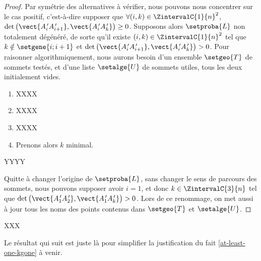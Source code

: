 \begin{proof}
    Par symétrie des alternatives à vérifier, nous pouvons nous concentrer sur le cas positif, c'est-à-dire supposer que
    $\forall (i, k) \in \ZintervalC{1}{n}^2$,
	$\det \big( \vect{A^{\,\prime}_i A^{\,\prime}_{i+1}}, \vect{A^{\,\prime}_i A^{\,\prime}_k} \big) \geq 0$.
    Supposons alors $\setproba{L}$ non totalement dégénéré, de sorte qu'il existe 
    $(i, k) \in \ZintervalC{1}{n}^2$ tel que
	$k \notin \setgene{i ; i+1}$
	et
	$\det \big( \vect{A^{\,\prime}_i A^{\,\prime}_{i+1}}, \vect{A^{\,\prime}_i A^{\,\prime}_k} \big) > 0$.
	Pour raisonner algorithmiquement, nous aurons besoin d'un ensemble $\setgeo{T}$ de sommets testés, et d'une liste $\setalge{U}$ de sommets utiles, tous les deux initialement vides.
	\begin{enumerate}
    	\item XXXX


    	\item XXXX


    	\item XXXX


    	\item Prenons alors $k$ minimal.
    \end{enumerate}
    
    
    YYYY
    
    
    Quitte à changer l'origine de $\setproba{L}$, sans changer le sens de parcours des sommets, nous pouvons supposer avoir $i = 1$, et donc
		$k \in \ZintervalC{3}{n}$
		tel que
		$\det \big( \vect{A^{\,\prime}_1 A^{\,\prime}_2}, \vect{A^{\,\prime}_1 A^{\,\prime}_k} \big) > 0$.
		Lors de ce renommage, on met aussi à jour tous les noms des points contenus dans $\setgeo{T}$ et $\setalge{U}$.
\end{proof}








\newpage %
XXX


Le résultat qui suit est juste là pour simplifier la justification du fait \ref{at-least-one-kgone} à venir.


